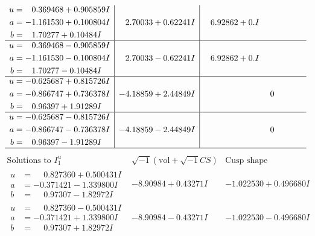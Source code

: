 \documentclass[1p]{elsarticle_modified}
\theoremstyle{definition}
\newcommand{\I}{\sqrt{-1}}
\begin{document}
$$\begin{array}{c|c|c}
\begin{aligned}
u &= \phantom{-}0.369468 + 0.905859 I \\
a &= -1.161530 + 0.100804 I \\
b &= \phantom{-}1.70277 + 0.10484 I\end{aligned}
 & \phantom{-}2.70033 + 0.62241 I & \phantom{-}6.92862 + 0. I\phantom{ +0.000000I} \\ \hline\begin{aligned}
u &= \phantom{-}0.369468 - 0.905859 I \\
a &= -1.161530 - 0.100804 I \\
b &= \phantom{-}1.70277 - 0.10484 I\end{aligned}
 & \phantom{-}2.70033 - 0.62241 I & \phantom{-}6.92862 + 0. I\phantom{ +0.000000I} \\ \hline\begin{aligned}
u &= -0.625687 + 0.815726 I \\
a &= -0.866747 + 0.736378 I \\
b &= \phantom{-}0.96397 + 1.91289 I\end{aligned}
 & -4.18859 + 2.44849 I & \phantom{-0.000000 } 0 \\ \hline\begin{aligned}
u &= -0.625687 - 0.815726 I \\
a &= -0.866747 - 0.736378 I \\
b &= \phantom{-}0.96397 - 1.91289 I\end{aligned}
 & -4.18859 - 2.44849 I & \phantom{-0.000000 } 0\\
 \hline 
 \end{array}$$\newpage$$\begin{array}{c|c|c}  
\text{Solutions to }I^u_{1}& \I (\text{vol} + \sqrt{-1}CS) & \text{Cusp shape}\\
 \hline 
\begin{aligned}
u &= \phantom{-}0.827360 + 0.500431 I \\
a &= -0.371421 - 1.339800 I \\
b &= \phantom{-}0.97307 - 1.82972 I\end{aligned}
 & -8.90984 + 0.43271 I & -1.022530 + 0.496680 I \\ \hline\begin{aligned}
u &= \phantom{-}0.827360 - 0.500431 I \\
a &= -0.371421 + 1.339800 I \\
b &= \phantom{-}0.97307 + 1.82972 I\end{aligned}
 & -8.90984 - 0.43271 I & -1.022530 - 0.496680 I \\ \hline\begin{aligned}

\end{aligned}
\end{array}$$
\end{document}

